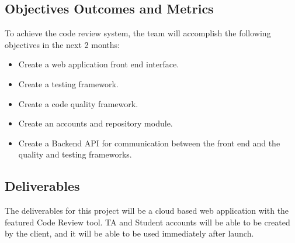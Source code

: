 
\subsection{Objectives Outcomes and Metrics}
To achieve the code review system, the team will accomplish the following
objectives in the next 2 months:

\begin{itemize}
\item Create a web application front end interface.
\item Create a testing framework.
\item Create a code quality framework.
\item Create an accounts and repository module.
\item Create a Backend API for communication between the front end and the
quality and testing frameworks.

\end{itemize}
\subsection{Deliverables}

The deliverables for this project will be a cloud based web application with the
featured Code Review tool. TA and Student accounts will be able to be created by
the client, and it will be able to be used immediately after launch.
